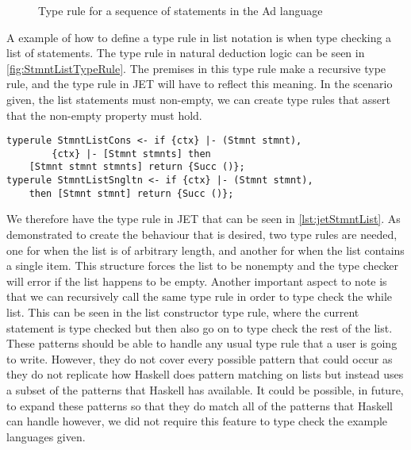 \begin{figure}
    \begin{prooftree}
    \end{prooftree}
    \caption{Type rule for a sequence of statements in the Ad language}
    \label{fig:StmntListTypeRule}
\end{figure}

A example of how to define a type rule in list notation is when type checking a list of statements.
The type rule in natural deduction logic can be seen in \autoref{fig:StmntListTypeRule}.
The premises in this type rule make a recursive type rule, and the type rule in JET will have to reflect this meaning.
In the scenario given, the list statements must non-empty, we can create type rules that assert that the non-empty property must hold.

\begin{lstlisting}[caption = Type rule in JET for a seqeunce of statements, label=lst:jetStmntList]
typerule StmntListCons <- if {ctx} |- (Stmnt stmnt), 
        {ctx} |- [Stmnt stmnts] then 
    [Stmnt stmnt stmnts] return {Succ ()};
typerule StmntListSngltn <- if {ctx} |- (Stmnt stmnt),
    then [Stmnt stmnt] return {Succ ()};
\end{lstlisting}

We therefore have the type rule in JET that can be seen in \autoref{lst:jetStmntList}.
As demonstrated to create the behaviour that is desired, two type rules are needed, one for when the list is of arbitrary length, and another for when the list contains a single item.
This structure forces the list to be nonempty and the type checker will error if the list happens to be empty.
Another important aspect to note is that we can recursively call the same type rule in order to type check the while list.
This can be seen in the list constructor type rule, where the current statement is type checked but then also go on to type check the rest of the list.
These patterns should be able to handle any usual type rule that a user is going to write.
However, they do not cover every possible pattern that could occur as they do not replicate how Haskell does pattern matching on lists but instead uses a subset of the patterns that Haskell has available.
It could be possible, in future, to expand these patterns so that they do match all of the patterns that Haskell can handle however, we did not require this feature to type check the example languages given.

